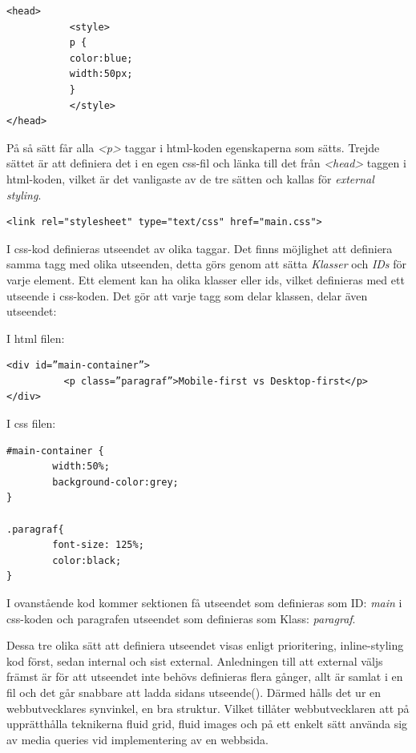 \documentclass[11pt]{article}
\begin{document}
\vspace{0.5cm}
\begin{verbatim}
<head>
           <style>
           p {
           color:blue;
           width:50px;
           }
           </style>
</head>
\end{verbatim}
\vspace{0.5cm}

På så sätt får alla \textit{<p>} taggar i html-koden egenskaperna som sätts. Trejde sättet är att definiera det i en egen css-fil och länka till det från \textit{<head>} taggen i html-koden, vilket är det vanligaste av de tre sätten och kallas för \textit{external styling}. 
\vspace{0.3cm}
\begin{verbatim}
<link rel="stylesheet" type="text/css" href="main.css">
\end{verbatim}
\vspace{0.5cm}

I css-kod definieras utseendet av olika taggar. Det finns möjlighet att definiera samma tagg med olika utseenden, detta görs genom att sätta \textit{Klasser} och \textit{IDs} för varje element. Ett element kan ha olika klasser eller ids, vilket definieras med ett utseende i css-koden. Det gör att varje tagg som delar klassen, delar även utseendet:

\vspace{0.3cm}
I html filen:

\begin{verbatim}
<div id=”main-container”>
          <p class=”paragraf”>Mobile-first vs Desktop-first</p>
</div>
\end{verbatim}
\vspace{0.5cm}
I css filen:

\begin{verbatim}
#main-container {
        width:50%;
        background-color:grey;
}

.paragraf{
        font-size: 125%;
        color:black;
}
\end{verbatim}
\vspace{1cm}

I ovanstående kod kommer sektionen få utseendet som definieras som ID: \textit{main} i css-koden och paragrafen utseendet som definieras som Klass: \textit{paragraf}.


Dessa tre olika sätt att definiera utseendet visas enligt prioritering, inline-styling kod först, sedan internal och sist external. Anledningen till att external väljs främst är för att utseendet inte behövs definieras flera gånger, allt är samlat i en fil och det går snabbare att ladda sidans utseende(\cite{css}). Därmed hålls det ur en webbutvecklares synvinkel, en bra struktur. Vilket tillåter webbutvecklaren att på upprätthålla teknikerna fluid grid, fluid images och på ett enkelt sätt använda sig av media queries vid implementering av en webbsida.
\end{document}
